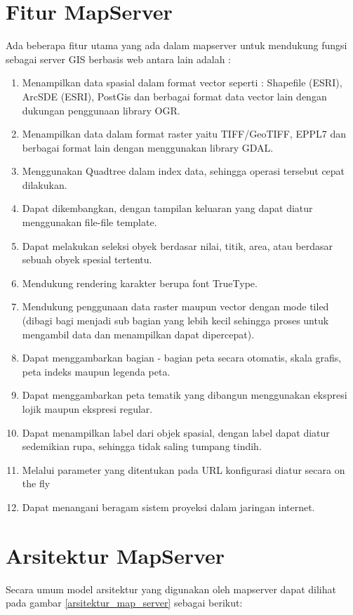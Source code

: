\section{Fitur MapServer}
Ada beberapa fitur utama yang ada dalam mapserver untuk mendukung fungsi sebagai server GIS berbasis web antara lain adalah :
\begin{enumerate}
\item Menampilkan data spasial dalam format vector seperti : Shapefile (ESRI), ArcSDE (ESRI), PostGis dan berbagai format data vector lain dengan dukungan penggunaan library OGR. 
\item Menampilkan data dalam format raster yaitu TIFF/GeoTIFF, EPPL7 dan berbagai format lain dengan menggunakan library GDAL.
\item Menggunakan Quadtree dalam index data, sehingga operasi tersebut cepat dilakukan. 
\item Dapat dikembangkan, dengan tampilan keluaran yang dapat diatur menggunakan file-file template.
\item Dapat melakukan seleksi obyek berdasar nilai, titik, area, atau berdasar sebuah obyek spesial tertentu.
\item Mendukung rendering  karakter berupa font TrueType. 
\item Mendukung penggunaan data raster maupun vector dengan mode tiled (dibagi bagi menjadi sub bagian yang lebih kecil sehingga proses untuk mengambil data dan menampilkan dapat dipercepat).
\item Dapat menggambarkan bagian - bagian  peta secara otomatis, skala grafis, peta indeks maupun legenda peta.
\item Dapat menggambarkan peta tematik yang dibangun menggunakan ekspresi lojik maupun ekspresi regular.
\item Dapat menampilkan label dari objek spasial, dengan label dapat diatur sedemikian rupa, sehingga tidak saling tumpang tindih.
\item Melalui parameter yang ditentukan pada URL konfigurasi diatur secara on the fly  
\item Dapat menangani beragam sistem proyeksi dalam jaringan internet. 
\end{enumerate}

\section{Arsitektur MapServer}
 Secara umum model arsitektur yang digunakan oleh mapserver dapat dilihat pada gambar \ref{arsitektur_map_server} sebagai berikut:

